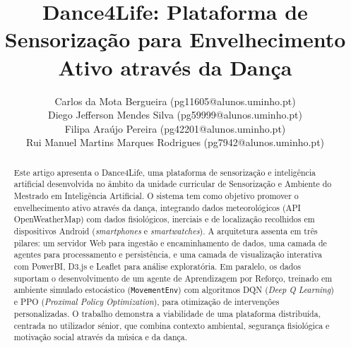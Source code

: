 \documentclass[runningheads]{llncs}
\begin{document}
%
\title{Dance4Life: Plataforma de Sensorização para Envelhecimento Ativo através da Dança}
%
%
\author{
Carlos da Mota Bergueira (pg11605@alunos.uminho.pt) \\
Diego Jefferson Mendes Silva (pg59999@alunos.uminho.pt) \\
Filipa Araújo Pereira (pg42201@alunos.uminho.pt) \\
Rui Manuel Martins Marques Rodrigues (pg7942@alunos.uminho.pt)
}
%
%
%
\maketitle              %
%
\begin{abstract}
Este artigo apresenta o Dance4Life, uma plataforma de sensorização e inteligência artificial desenvolvida no âmbito da unidade curricular de Sensorização e Ambiente do Mestrado em Inteligência Artificial. O sistema tem como objetivo promover o envelhecimento ativo através da dança, integrando dados meteorológicos (API OpenWeatherMap) com dados fisiológicos, inerciais e de localização recolhidos em dispositivos Android (\textit{smartphones} e \textit{smartwatches}). A arquitetura assenta em três pilares: um servidor Web para ingestão e encaminhamento de dados, uma camada de agentes para processamento e persistência, e uma camada de visualização interativa com PowerBI, D3.js e Leaflet para análise exploratória. Em paralelo, os dados suportam o desenvolvimento de um agente de Aprendizagem por Reforço, treinado em ambiente simulado estocástico (\texttt{MovementEnv}) com algoritmos DQN (\textit{Deep Q Learning}) e PPO (\textit{Proximal Policy Optimization}), para otimização de intervenções personalizadas. O trabalho demonstra a viabilidade de uma plataforma distribuída, centrada no utilizador sénior, que combina contexto ambiental, segurança fisiológica e motivação social através da música e da dança.

\end{abstract}
%
%
%
\end{document}
